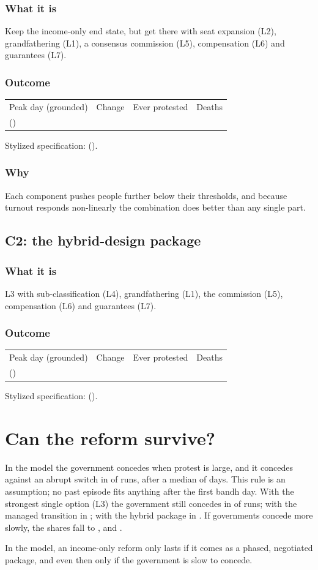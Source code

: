 \documentclass[11pt,a4paper]{article}
\makeatletter
\newcommand{\outcomeline}[6]{%
  \begin{tabular}{@{}llll@{}}
  \sffamily\small\color{muted}Peak day (grounded) & \sffamily\small\color{muted}Change & \sffamily\small\color{muted}Ever protested & \sffamily\small\color{muted}Deaths\\
  \textbf{#1} \small(#2) & \textbf{#3} & #4 & #5\\
  \end{tabular}\par\smallskip
  {\small\color{muted}Stylized specification: #6}\par}
\makeatother
\begin{document}
\subsubsection{What it is}
Keep the income-only end state, but get there with seat expansion (L2), grandfathering (L1), a consensus commission (L5), compensation (L6) and guarantees (L7).
\subsubsection{Outcome}
\outcomeline{\PeakGroundedManagedTransition}{\PeakRangeGroundedManagedTransition}{\PeakChangeGroundedManagedTransition}{\CumulativeGroundedManagedTransition}{\DeathsGroundedManagedTransition}{\PeakCentralManagedTransition{} (\PeakChangeCentralManagedTransition).}
\subsubsection{Why}
Each component pushes people further below their thresholds, and because turnout responds non-linearly the combination does better than any single part.

\subsection{C2: the hybrid-design package}
\subsubsection{What it is}
L3 with sub-classification (L4), grandfathering (L1), the commission (L5), compensation (L6) and guarantees (L7).
\subsubsection{Outcome}
\outcomeline{\PeakGroundedHybridPackage}{\PeakRangeGroundedHybridPackage}{\PeakChangeGroundedHybridPackage}{\CumulativeGroundedHybridPackage}{\DeathsGroundedHybridPackage}{\PeakCentralHybridPackage{} (\PeakChangeCentralHybridPackage).}

\section{Can the reform survive?}
In the model the government concedes when protest is large, and it concedes against an abrupt switch in \ConcessionReferenceBaselineShare{} of runs, after a median of \ConcessionReferenceBaselineDay{} days. This rule is an assumption; no past episode fits anything after the first bandh day. With the strongest single option (L3) the government still concedes in \ConcessionReferenceShareLThree{} of runs; with the managed transition in \ConcessionReferenceShareCOne; with the hybrid package in \ConcessionReferenceShareCTwo. If governments concede more slowly, the shares fall to \ConcessionSlowShareLThree, \ConcessionSlowShareCOne{} and \ConcessionSlowShareCTwo.
\begin{plainwords}In the model, an income-only reform only lasts if it comes as a phased, negotiated package, and even then only if the government is slow to concede.\end{plainwords}
\end{document}
